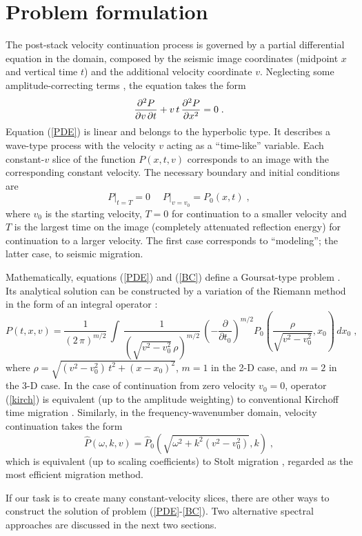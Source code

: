 \section{Problem formulation}
\par
The post-stack velocity continuation process is governed by a partial
differential equation in the domain, composed by the seismic image
coordinates (midpoint $x$ and vertical time $t$) and the additional
velocity coordinate $v$. Neglecting some amplitude-correcting terms
\cite[]{Fomel.sep.92.159}, the equation takes the form
\cite[]{Claerbout.sep.48.79}
\begin{equation}
  \label{PDE}
  {{\partial^2 P} \over {\partial v\, \partial t}} +
  v\,t\,{{\partial^2 P} \over {\partial x^2}} = 0\;.
\end{equation}
Equation (\ref{PDE}) is linear and belongs to the hyperbolic type. It
describes a wave-type process with the velocity $v$ acting as a
``time-like'' variable. Each constant-$v$ slice of the function
$P(x,t,v)$ corresponds to an image with the corresponding constant
velocity. The necessary boundary and initial conditions are 
\begin{equation}
  \label{BC}
  \left.P\right|_{t=T} = 0\;\quad \left.P\right|_{v=v_0} = P_0 (x,t)\;,
\end{equation}
where $v_0$ is the starting velocity, $T=0$ for continuation to a
smaller velocity and $T$ is the largest time on the image (completely
attenuated reflection energy) for continuation to a larger velocity.
The first case corresponds to ``modeling''; the latter case, to
seismic migration.
\par
Mathematically, equations (\ref{PDE}) and (\ref{BC}) define a
Goursat-type problem \cite[]{kurant}. Its analytical solution can be
constructed by a variation of the Riemann method in the form of an
integral operator \cite[]{me,Fomel.sep.92.159}:
\begin{equation}
  \label{kirch}
  P(t,x,v) = \frac{1}{(2\,\pi)^{m/2}}\,\int\, 
  \frac{1}{(\sqrt{v^2-v_0^2}\,\rho)^{m/2}}\, 
  \left(- \frac{\partial}{\partial t_0}\right)^{m/2}
  P_0\left(\frac{\rho}{\sqrt{v^2-v_0^2}},x_0\right)\,dx_0\;,
\end{equation}
where $\rho = \sqrt{(v^2-v_0^2)\,t^2 + (x - x_0)^2}$, $m=1$ in the 2-D
case, and $m=2$ in the 3-D case. In the case of continuation from zero
velocity $v_0=0$, operator (\ref{kirch}) is equivalent (up to the
amplitude weighting) to conventional Kirchoff time migration
\cite[]{GEO43-01-00490076}.  Similarly, in the frequency-wavenumber
domain, velocity continuation takes the form
\begin{equation}
  \label{stolt}
  \hat{P} (\omega,k,v) = \hat{P}_0 (\sqrt{\omega^2+k^2 (v^2-v_0^2)},k)\;,
\end{equation}
which is equivalent (up to scaling coefficients) to Stolt migration
\cite[]{GEO50-11-22192244}, regarded as the most efficient migration
method.
\par
If our task is to create many constant-velocity slices, there are
other ways to construct the solution of problem (\ref{PDE}-\ref{BC}).
Two alternative spectral approaches are discussed in the next two
sections.
\par
